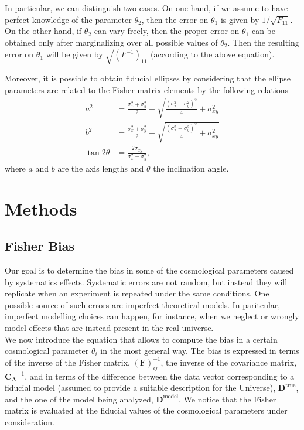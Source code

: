 \documentclass[modern]{lsstdescnote}
\begin{document}
In particular, we can distinguish two cases.
On one hand, if we assume to have perfect knowledge of the parameter $\theta_2$, then the error on $\theta_1$ is given by $1/\sqrt{F_{11}}$. 
On the other hand, if $\theta_2$ can vary freely, then the proper error on $\theta_1$ can be obtained only after
marginalizing over all possible values of $\theta_2$.
Then the resulting error on $\theta_1$ will be given by $\sqrt{\left(F^{-1}\right)_{11}}$ (according to the above equation). 


Moreover, it is possible to obtain fiducial ellipses by considering
that the ellipse parameters are related to the Fisher matrix elements by the following relations
\begin{align}
  a^{2} &=\frac{\sigma_{x}^{2}+\sigma_{y}^{2}}{2}+\sqrt{\frac{\left(\sigma_{x}^{2}-\sigma_{y}^{2}\right)^{2}}{4}+\sigma_{x y}^{2}} \\
  b^{2} &=\frac{\sigma_{x}^{2}+\sigma_{y}^{2}}{2}-\sqrt{\frac{\left(\sigma_{x}^{2}-\sigma_{y}^{2}\right)^{2}}{4}+\sigma_{x y}^{2}} \\
  \tan 2 \theta &=\frac{2 \sigma_{x y}}{\sigma_{x}^{2}-\sigma_{y}^{2}},
  \end{align}
where $a$ and $b$ are the axis lengths and $\theta$ the inclination angle.

\section{Methods}
\subsection{Fisher Bias}
Our goal is to determine the bias in some of the cosmological parameters caused by systematics effects. 
Systematic errors are not random, but instead they will replicate when an experiment is repeated under the same conditions.
One possible source of such errors are imperfect theoretical models. In paritcular, imperfect modelling choices 
can happen, for instance, when we neglect or wrongly model effects that are instead present in the real universe.\\

We now introduce the equation that allows to compute the bias in a certain cosmological parameter $\theta_i$ in the most general way. 
The bias is expressed in terms of the inverse of the Fisher matrix, $(\boldsymbol{F})^{-1}_{ij}$, the inverse of the covariance matrix, $\boldsymbol{C_A}^{-1}$, and in terms of the difference between the data vector
corresponding to a fiducial model (assumed to provide a suitable description for the Universe), $\boldsymbol{D}^{\mathrm{true}}$, and the one of the model being analyzed, $\boldsymbol{D}^{\mathrm{model}}$.
We notice that the Fisher matrix is evaluated at the fiducial values of the cosmological parameters under consideration.
\end{document}
